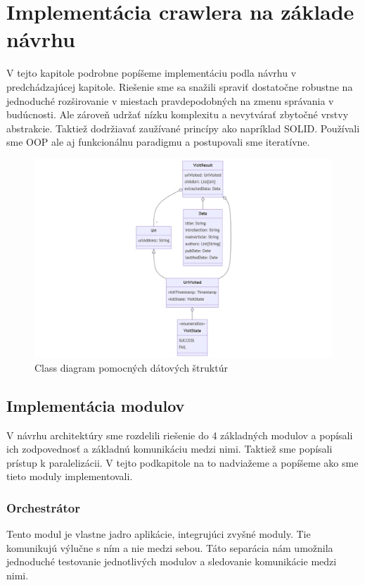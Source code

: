 \chapter{Implementácia crawlera na základe návrhu}
\label{implementation}
V tejto kapitole podrobne popíšeme implementáciu podla návrhu v predchádzajúcej kapitole. Riešenie sme sa snažili spraviť dostatočne robustne na jednoduché rozširovanie v miestach pravdepodobných na zmenu správania v budúcnosti. Ale zároveň udržať nízku komplexitu a nevytvárať zbytočné vrstvy abstrakcie. Taktiež dodržiavať zaužívané princípy ako napríklad SOLID. 
Používali sme OOP ale aj funkcionálnu paradigmu a postupovali sme iteratívne. 

\begin{figure}[!ht]
    \centering
    \includegraphics[width=.9\textwidth]{figures/classDiagramVisitResult.png}
    \caption{Class diagram pomocných dátových štruktúr \label{o:classDiagramVisitResult}}
\end{figure}

\section{Implementácia modulov}
V návrhu architektúry sme rozdelili riešenie do 4 základných modulov a popísali ich zodpovednosť a základnú komunikáciu medzi nimi. Taktiež sme popísali prístup k paralelizácii. V tejto podkapitole na to nadviažeme a popíšeme ako sme tieto moduly implementovali. 

\subsection{Orchestrátor}
Tento modul je vlastne jadro aplikácie, integrujúci zvyšné moduly. Tie komunikujú výlučne s ním a nie medzi sebou. Táto separácia nám umožnila jednoduché testovanie jednotlivých modulov a sledovanie komunikácie medzi nimi.

